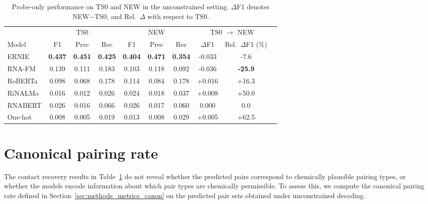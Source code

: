 \documentclass[logo,bsc,singlespacing,parskip]{infthesis}
\begin{document}
\begin{table}[t]
\centering
\caption{Probe-only performance on TS0 and NEW in the unconstrained setting.
$\Delta$F1 denotes NEW$-$TS0, and Rel.\ $\Delta$ with respect to TS0.}
\label{tab:probe_unconstrained_full}
\begin{tabular}{lccccccccc}
\toprule
& \multicolumn{3}{c}{TS0} & \multicolumn{3}{c}{NEW} & \multicolumn{2}{c}{TS0 $\rightarrow$ NEW} \\
\cmidrule(lr){2-4} \cmidrule(lr){5-7} \cmidrule(lr){8-9}
Model & F1 & Prec & Rec & F1 & Prec & Rec & $\Delta$F1 & Rel.\ $\Delta$F1 (\%) \\
\midrule
ERNIE   
& \textbf{0.437} & \textbf{0.451} & \textbf{0.425} 
& \textbf{0.404} & \textbf{0.471} & \textbf{0.354} 
& -0.033 & -7.6 \\

RNA-FM   
& 0.139 & 0.111 & 0.183 
& 0.103 & 0.118 & 0.092 
& -0.036 & \textbf{-25.9} \\

RoBERTa 
& 0.098 & 0.068 & 0.178 
& 0.114 & 0.084 & 0.178 
& +0.016 & +16.3 \\

RiNALMo 
& 0.016 & 0.012 & 0.026 
& 0.024 & 0.018 & 0.037 
& +0.008 & +50.0 \\

RNABERT 
& 0.026 & 0.016 & 0.066 
& 0.026 & 0.017 & 0.060 
& 0.000 & 0.0 \\

One-hot 
& 0.008 & 0.005 & 0.019 
& 0.013 & 0.008 & 0.029 
& +0.005 & +62.5 \\

\bottomrule
\end{tabular}
\end{table}

\section{Canonical pairing rate}
\label{sec:results_canonical_rate_unconstrained}
The contact recovery results in Table~\ref{tab:probe_unconstrained_full} do not reveal whether the predicted pairs correspond to chemically plausible pairing types, or whether the models encode information about which pair types are chemically permissible.
To assess this, we compute the canonical pairing rate defined in Section~\ref{sec:methods_metrics_canon} on the predicted pair sets obtained under unconstrained decoding.
\end{document}
